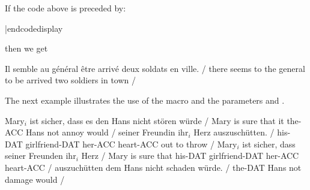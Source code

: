 If the code above is preceded by:

\codedisplay
{}|endcodedisplay

\noindent then we get

\framedisplay
\ex
\begingl[glspace=1.2em,everygla=\rm,everyglb=\sl,everyglc=\it,
   aboveglcskip=1ex]
\gla Il semble au g\'en\'eral \^etre arriv\'e deux soldats en
ville. /
\glb there seems {to the} general {to be} arrived two soldiers in
town /
\endgl
\xe
\endframedisplay

The next example illustrates the use of the macro \idx{|\moregl|}
and the parameters \hbox{} and
\hbox{.}

\begingroup
\framedisplay
\pex[moregloffset=1em,aboveglhangskip=1ex]
\nopreamble
\def\\#1{-{\tenrm #1}}%
\a
\begingl
\gla Mary$_i$ ist sicher, dass es den Hans nicht st\"oren w\"urde /
\glb Mary is sure that it the\\{ACC} Hans not annoy would /
\moregl
\gla seiner Freundin ihr$_i$ Herz auszusch\"utten. /
\glb his\\{DAT} girlfriend\\{DAT} her\\{ACC} heart\\{ACC}
{out to throw} /
\endgl
\a
\begingl
\gla Mary$_i$ ist sicher, dass seiner Freunden ihr$_i$ Herz /
\glb Mary is sure that his\\{DAT} girlfriend\\{DAT} her\\{ACC}
heart\\{ACC} /
\moregl
\gla auszuch\"utten dem Hans nicht schaden w\"urde. /
 the\\{DAT} Hans not damage would /
\endgl
\xe
\endframedisplay
\endgroup

